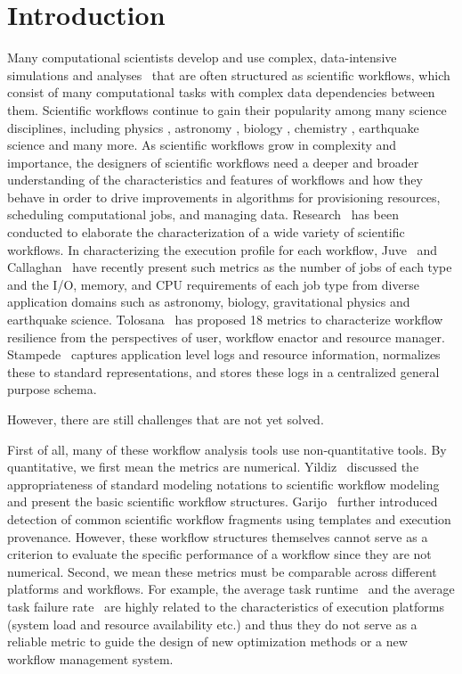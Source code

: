 \section{Introduction}
\label{intro}

Many computational scientists develop and use complex, data-intensive simulations and analyses~\cite{Hey2009} that are often structured as scientific workflows, which consist of many computational tasks with complex data dependencies between them. Scientific workflows continue to gain their popularity among many science disciplines, including physics \cite{Deelman2002}, astronomy \cite{Sakellariou2010}, biology \cite{Lathers2006, Oinn2004}, chemistry \cite{Wieczorek2005}, earthquake science \cite{Maechling2007} and many more. As scientific workflows grow in complexity and importance, the designers of scientific workflows need a deeper and broader understanding of the characteristics and features of workflows and how they behave in order to drive improvements in algorithms for provisioning resources, scheduling computational jobs, and managing data. Research~\cite{Juve2013, Calasanz2008, Tolosana2011, Callaghan2011, Gunter2011, Yildiz2009, Ramakrishnan2008, Bharathi2008, Gu2013} has been conducted to elaborate the characterization of a wide variety of scientific workflows. In characterizing the execution profile for each workflow, Juve~\cite{Juve2013} and Callaghan~\cite{Callaghan2011} have recently present such metrics as the number of jobs of each type and the I/O, memory, and CPU requirements of each job type from diverse application domains such as astronomy, biology, gravitational physics and earthquake science. Tolosana~\cite{Tolosana2011} has proposed 18 metrics to characterize workflow resilience from the perspectives of user, workflow enactor and resource manager. Stampede~\cite{Gunter2011} captures application level logs and resource information, normalizes these to standard representations, and stores these logs in a centralized general purpose schema.

However, there are still challenges that are not yet solved. 

First of all, many of these workflow analysis tools use non-quantitative tools. By quantitative, we first mean the metrics are numerical. Yildiz~\cite{Yildiz2009} discussed the appropriateness of standard modeling notations to scientific workflow modeling and present the basic scientific workflow structures. Garijo~\cite{Garijo2013} further introduced detection of common scientific workﬂow fragments using templates and execution provenance. However, these workflow structures themselves cannot serve as a criterion to evaluate the specific performance of a workflow since they are not numerical. Second, we mean these metrics must be comparable across different platforms and workflows. For example, the average task runtime~\cite{Juve2013} and the average task failure rate~\cite{Callaghan2011} are highly related to the characteristics of execution platforms (system load and resource availability etc.) and thus they do not serve as a reliable metric to guide the design of new optimization methods or a new workflow management system. 

